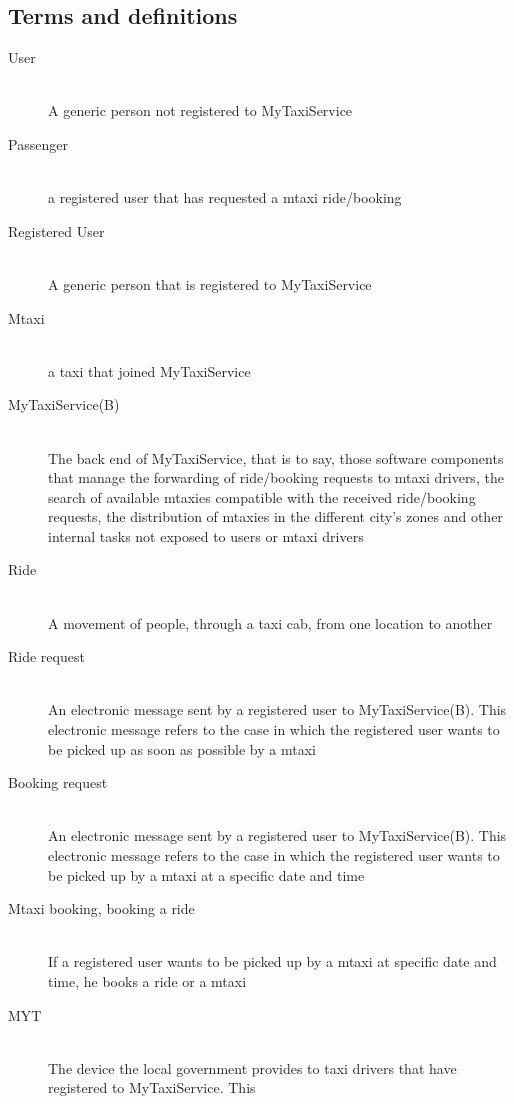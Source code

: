 \documentclass[11pt,titlepage]{article} %
\begin{document}
  \subsection{Terms and definitions}
	\begin{description}
	      \item [User] \hfill \\A generic person not registered to MyTaxiService
	      \item [Passenger] \hfill \\ a registered user that has requested a mtaxi ride/booking
	      \item [Registered User] \hfill \\ A generic person that is registered to MyTaxiService
	      \item [Mtaxi] \hfill \\ a taxi that joined MyTaxiService
	      \item [MyTaxiService(B)] \hfill \\ The back end of MyTaxiService, that is to say, those software components
	        that manage the forwarding of ride/booking requests to mtaxi drivers, the search of available mtaxies compatible with the received ride/booking requests, the distribution
	        of mtaxies in the different city's zones and other internal tasks not exposed to users or mtaxi drivers
	      \item[Ride] \hfill \\ A movement of people, through a taxi cab, from one location to another
	      \item [Ride request] \hfill \\ An electronic message sent by a registered user
	        to MyTaxiService(B). This electronic message refers to the case in which the registered user wants to be picked up as soon as possible by a mtaxi
	      \item[Booking request]\hfill \\ An electronic message sent by a registered user
	         to MyTaxiService(B). This electronic message refers to the case in which the registered user wants to be picked up by a mtaxi at a specific date and time
	      \item[Mtaxi booking, booking a ride] \hfill\\If a registered user wants to be picked up by a mtaxi at specific date and time, he books a ride or a mtaxi
	      \item [MYT] \hfill \\The device the local government provides to taxi drivers that have registered to MyTaxiService. This

\end{description}
\end{document}

